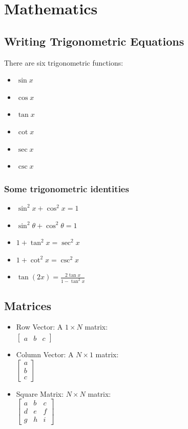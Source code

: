 \documentclass[12pt,a4paper]{article}
\begin{document}
	\pagebreak
	
	\section{Mathematics}
	
	\subsection{Writing Trigonometric Equations}
	There are six trigonometric functions:
	\begin{itemize}
		\item \(\sin x\)
		\item \(\cos x\)
		\item \(\tan x\)
		\item \(\cot x\)
		\item \(\sec x\)
		\item \(\csc x\)
	\end{itemize}
	
	\subsubsection{Some trigonometric identities}
	\begin{itemize}
		\item $\sin^2 x + \cos^2 x = 1$
		\item $\sin^2 \theta + \cos^2 \theta = 1$
		\item $1 + \tan^2 x = \sec^2 x$
		\item $1 + \cot^2 x = \csc^2 x$
		\item $\tan(2x) = \frac{2 \tan x}{1 - \tan^2 x}$
	\end{itemize}
	
	\subsection{Matrices}
	\begin{itemize}
		\item Row Vector: A $1 \times N$ matrix:\\
		\(
		\begin{bmatrix}
			a & b & c
		\end{bmatrix}
		\)
		\item Column Vector: A $N \times 1$ matrix:\\
		\(
		\begin{bmatrix}
			a \\
			b \\
			c
		\end{bmatrix}
		\)
		\item Square Matrix: $N \times N$ matrix:\\
		\(
		\begin{bmatrix}
			a & b & c \\
			d & e & f \\
			g & h & i
		\end{bmatrix}
		\)
	\end{itemize}
	
\end{document}
